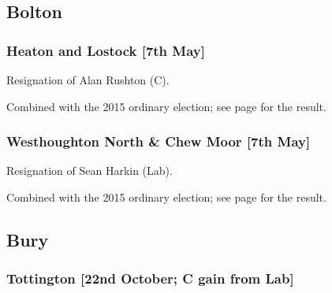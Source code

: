 \documentclass[a4paper,openany]{book}
\begin{document}
\begin{resultsiii}
\section[Greater Manchester]{}

\subsection*{Bolton}

\subsubsection*{Heaton and Lostock \hspace*{\fill}\nolinebreak[1]%
\enspace\hspace*{\fill}
[7th May]}


Resignation of Alan Rushton (C).

Combined with the 2015 ordinary election; see page \pageref{HeatonLostockBolton} for the result.

\subsubsection*{Westhoughton North \& Chew Moor \hspace*{\fill}\nolinebreak[1]%
\enspace\hspace*{\fill}
[7th May]}


Resignation of Sean Harkin (Lab).

Combined with the 2015 ordinary election; see page \pageref{WesthoughtonNorthChewMoorBolton} for the result.

\subsection*{Bury}

\subsubsection*{Tottington \hspace*{\fill}\nolinebreak[1]%
\enspace\hspace*{\fill}
[22nd October; C gain from Lab]}


\end{resultsiii}
\end{document}
